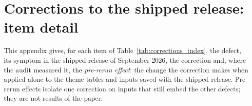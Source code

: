\section{Corrections to the shipped release: item detail}\label{oa:corrections}

This appendix gives, for each item of Table~\ref{tab:corrections_index}, the defect, its symptom in
the shipped release of September 2026, the correction and, where the audit measured it, the
\emph{pre-rerun effect}: the change the correction makes when applied alone to the theme tables and
inputs saved with the shipped release. Pre-rerun effects isolate one correction on inputs that
still embed the other defects; they are not results of the paper.

